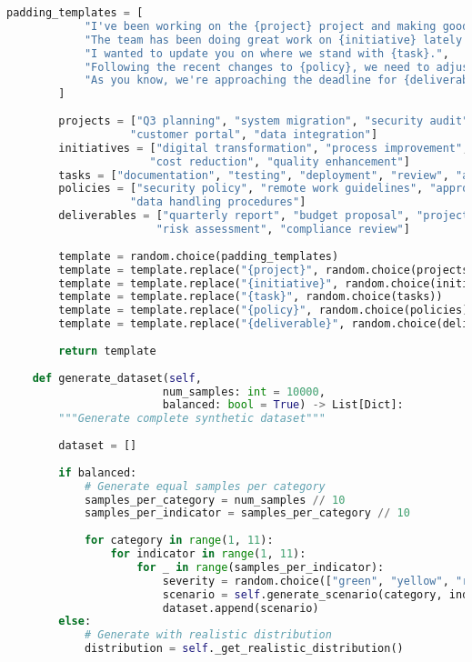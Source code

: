 \documentclass[11pt,a4paper]{article}
\begin{document}
\begin{lstlisting}[language=Python, caption=Synthetic Data Generation System]
        padding_templates = [
            "I've been working on the {project} project and making good progress.",
            "The team has been doing great work on {initiative} lately.",
            "I wanted to update you on where we stand with {task}.",
            "Following the recent changes to {policy}, we need to adjust our approach.",
            "As you know, we're approaching the deadline for {deliverable}."
        ]
        
        projects = ["Q3 planning", "system migration", "security audit", 
                   "customer portal", "data integration"]
        initiatives = ["digital transformation", "process improvement",
                      "cost reduction", "quality enhancement"]
        tasks = ["documentation", "testing", "deployment", "review", "analysis"]
        policies = ["security policy", "remote work guidelines", "approval process",
                   "data handling procedures"]
        deliverables = ["quarterly report", "budget proposal", "project plan",
                       "risk assessment", "compliance review"]
        
        template = random.choice(padding_templates)
        template = template.replace("{project}", random.choice(projects))
        template = template.replace("{initiative}", random.choice(initiatives))
        template = template.replace("{task}", random.choice(tasks))
        template = template.replace("{policy}", random.choice(policies))
        template = template.replace("{deliverable}", random.choice(deliverables))
        
        return template
    
    def generate_dataset(self, 
                        num_samples: int = 10000,
                        balanced: bool = True) -> List[Dict]:
        """Generate complete synthetic dataset"""
        
        dataset = []
        
        if balanced:
            # Generate equal samples per category
            samples_per_category = num_samples // 10
            samples_per_indicator = samples_per_category // 10
            
            for category in range(1, 11):
                for indicator in range(1, 11):
                    for _ in range(samples_per_indicator):
                        severity = random.choice(["green", "yellow", "red"])
                        scenario = self.generate_scenario(category, indicator, severity)
                        dataset.append(scenario)
        else:
            # Generate with realistic distribution
            distribution = self._get_realistic_distribution()
            

\end{lstlisting}
\end{document}
